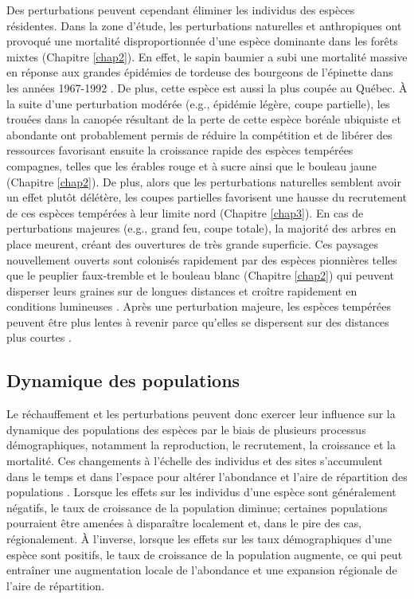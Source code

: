 Des perturbations peuvent cependant éliminer les individus des espèces
résidentes. Dans la zone d'étude, les perturbations naturelles et
anthropiques ont provoqué une mortalité disproportionnée d'une espèce
dominante dans les forêts mixtes (Chapitre \ref{chap2}). En effet, le
sapin baumier a subi une mortalité massive en réponse aux grandes
épidémies de tordeuse des bourgeons de l'épinette dans les années
1967-1992 \citep{duchesne_population_2008}. De plus, cette espèce est
aussi la plus coupée au Québec. À la suite d'une perturbation modérée
(e.g., épidémie légère, coupe partielle), les trouées dans la canopée
résultant de la perte de cette espèce boréale ubiquiste et abondante ont
probablement permis de réduire la compétition et de libérer des
ressources favorisant ensuite la croissance rapide des espèces tempérées
compagnes, telles que les érables rouge et à sucre ainsi que le bouleau
jaune (Chapitre \ref{chap2}). De plus, alors que les perturbations
naturelles semblent avoir un effet plutôt délétère, les coupes
partielles favorisent une hausse du recrutement de ces espèces tempérées
à leur limite nord (Chapitre \ref{chap3}). En cas de perturbations
majeures (e.g., grand feu, coupe totale), la majorité des arbres en
place meurent, créant des ouvertures de très grande superficie. Ces
paysages nouvellement ouverts sont colonisés rapidement par des espèces
pionnières telles que le peuplier faux-tremble et le bouleau blanc
(Chapitre \ref{chap2}) qui peuvent disperser leurs graines sur de
longues distances et croître rapidement en conditions lumineuses
\citep{boucher_fire_2017, grondin_have_2018}. Après une perturbation
majeure, les espèces tempérées peuvent être plus lentes à revenir parce
qu'elles se dispersent sur des distances plus courtes
\citep{scheller_spatially_2005}.

\hypertarget{dynamique-des-populations}{%
\subsection{Dynamique des populations}\label{dynamique-des-populations}}

Le réchauffement et les perturbations peuvent donc exercer leur
influence sur la dynamique des populations des espèces par le biais de
plusieurs processus démographiques, notamment la reproduction, le
recrutement, la croissance et la mortalité. Ces changements à l'échelle
des individus et des sites s'accumulent dans le temps et dans l'espace
pour altérer l'abondance et l'aire de répartition des populations
\citep{holt_theoretical_2005}. Lorsque les effets sur les individus
d'une espèce sont généralement négatifs, le taux de croissance de la
population diminue; certaines populations pourraient être amenées à
disparaître localement et, dans le pire des cas, régionalement. À
l'inverse, lorsque les effets sur les taux démographiques d'une espèce
sont positifs, le taux de croissance de la population augmente, ce qui
peut entraîner une augmentation locale de l'abondance et une expansion
régionale de l'aire de répartition.


